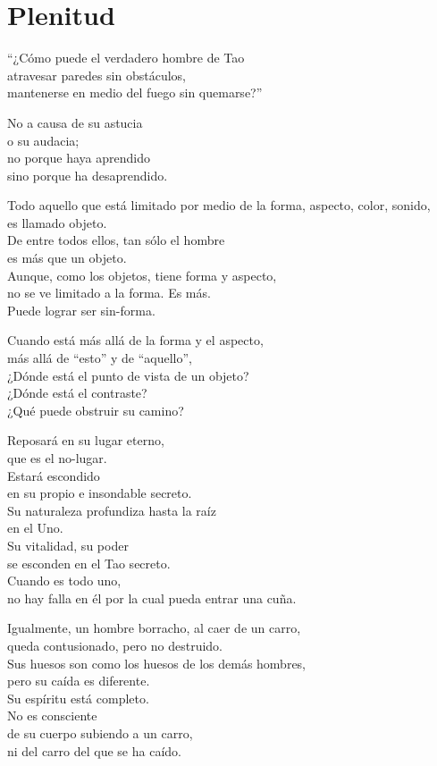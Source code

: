 \documentclass[hidelinks]{memoir}
\begin{document}
	\chapter*{Plenitud}
	
	``¿Cómo puede el verdadero hombre de Tao\\
	atravesar paredes sin obstáculos,\\
	mantenerse en medio del fuego sin quemarse?''
	
	No a causa de su astucia\\
	o su audacia;\\
	no porque haya aprendido\\
	sino porque ha desaprendido.
	
	Todo aquello que está limitado por medio de la forma, aspecto, color,
	sonido,\\
	es llamado objeto.\\
	De entre todos ellos, tan sólo el hombre\\
	es más que un objeto.\\
	Aunque, como los objetos, tiene forma y aspecto,\\
	no se ve limitado a la forma. Es más.\\
	Puede lograr ser sin-forma.
	
	Cuando está más allá de la forma y el aspecto,\\
	más allá de ``esto'' y de ``aquello'',\\
	¿Dónde está el punto de vista de un objeto?\\
	¿Dónde está el contraste?\\
	¿Qué puede obstruir su camino?
	
	Reposará en su lugar eterno,\\
	que es el no-lugar.\\
	Estará escondido\\
	en su propio e insondable secreto.\\
	Su naturaleza profundiza hasta la raíz\\
	en el Uno.\\
	Su vitalidad, su poder\\
	se esconden en el Tao secreto.\\
	Cuando es todo uno,\\
	no hay falla en él por la cual pueda entrar una cuña.
	
	Igualmente, un hombre borracho, al caer de un carro,\\
	queda contusionado, pero no destruido.\\
	Sus huesos son como los huesos de los demás hombres,\\
	pero su caída es diferente.\\
	Su espíritu está completo.\\
	No es consciente\\
	de su cuerpo subiendo a un carro,\\
	ni del carro del que se ha caído.
	
\end{document}

